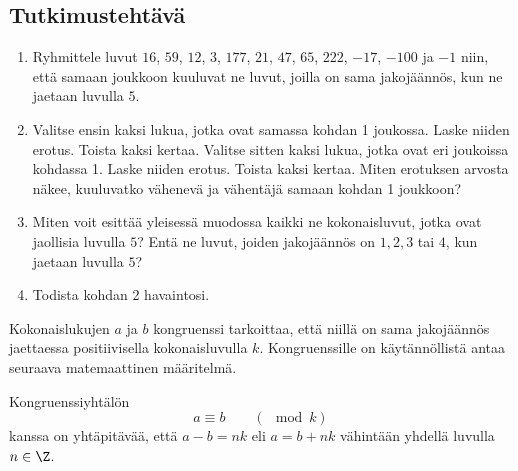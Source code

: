 \subsection*{Tutkimustehtävä}
\begin{enumerate}
\item Ryhmittele luvut $16$, $59$, $12$, $3$, $177$, $21$, $47$, $65$, $222$, $-17$, $-100$ ja $-1$ niin, että samaan joukkoon kuuluvat ne luvut, joilla on sama jakojäännös, kun ne jaetaan luvulla $5$.
\item Valitse ensin kaksi lukua, jotka ovat samassa kohdan 1 joukossa. Laske niiden erotus. Toista kaksi kertaa. Valitse sitten kaksi lukua, jotka ovat eri joukoissa kohdassa 1. Laske niiden erotus. Toista kaksi kertaa. Miten erotuksen arvosta näkee, kuuluvatko vähenevä ja vähentäjä samaan kohdan 1 joukkoon?
\item Miten voit esittää yleisessä muodossa kaikki ne kokonaisluvut, jotka ovat jaollisia luvulla $5$? Entä ne luvut, joiden jakojäännös on $1, 2, 3$ tai $4$, kun jaetaan luvulla $5$?
\item Todista kohdan 2 havaintosi.
\end{enumerate}

Kokonaislukujen $a$ ja $b$ kongruenssi tarkoittaa, että niillä on sama jakojäännös jaettaessa positiivisella kokonaisluvulla $k$. Kongruenssille on käytännöllistä antaa seuraava matemaattinen määritelmä.


Kongruenssiyhtälön
\[
a\equiv b\qquad (\mod k)
\]
kanssa on yhtäpitävää, että $a-b=nk$ eli $a=b+nk$ vähintään yhdellä luvulla $n\in \Z$.


